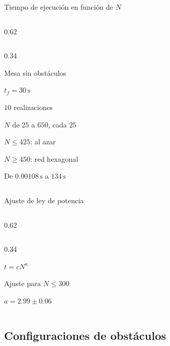 \documentclass[aspectratio=169,10pt]{beamer}
\begin{document}
\fi

\begin{frame}{Tiempo de ejecución en función de $N$}
  \begin{cols}
    \begin{column}{0.62\textwidth}
    \end{column}
    \begin{column}{0.34\textwidth}
      \begin{parametros}
        \item Mesa sin obstáculos
        \item $t_{f} = 30\,\mathrm{s}$
        \item $10$ realizaciones
        \item $N$ de $25$ a $650$, cada $25$
        \item $N \leq 425$: al azar
        \item $N \geq 450$: red hexagonal
      \end{parametros}
      \begin{resultado}
        \item De $0.00108\,\mathrm{s}$ a $134\,\mathrm{s}$
      \end{resultado}
    \end{column}
  \end{cols}
\end{frame}


\begin{frame}{Ajuste de ley de potencia}
  \begin{cols}
    \begin{column}{0.62\textwidth}
    \end{column}
    \begin{column}{0.34\textwidth}
      \begin{parametros}
        \item $t = cN^{a}$
        \item Ajuste para $N \leq 300$
      \end{parametros}
      \begin{resultado}
        \item $a = 2.99 \pm 0.06$
      \end{resultado}
    \end{column}
  \end{cols}
\end{frame}


\subsection{Configuraciones de obstáculos}
\end{document}
